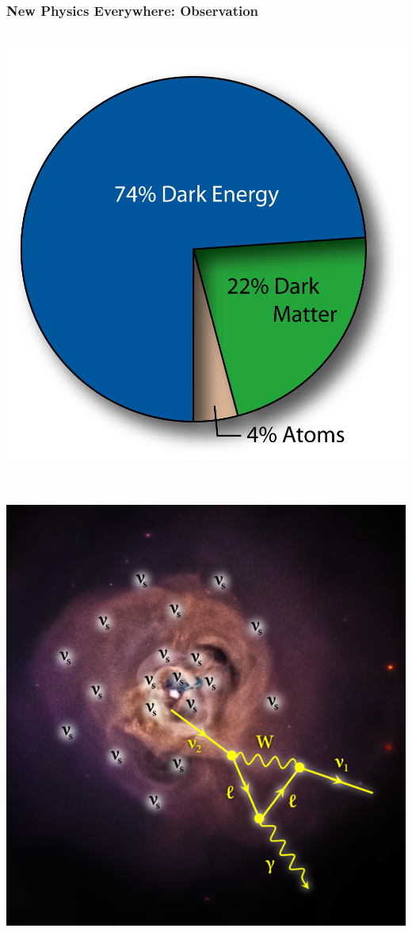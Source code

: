 \documentclass{beamer}
\begin{document}
\begin{frame}
\frametitle{New Physics Everywhere: Observation}
\begin{minipage}[b]{0.80\paperwidth}
 \begin{tcolorbox}[colback=UNL@Cream!5,colframe=UNL@Cream!60,title=\textcolor{UMN@Maroon}{\textbf{Universe Matter Budget.}}]
\mbox{
\includegraphics[height=0.35\linewidth,width=0.50\linewidth]{THESISPLOTS/New-Physics-PLOTS/UniversePie30.jpg} }
   
 \end{tcolorbox}
 
\end{minipage}

\begin{minipage}[b]{0.80\paperwidth}
 \begin{tcolorbox}[colback=UNL@Cream!5,colframe=UNL@Cream!60,title=\textcolor{UMN@Maroon}{\textbf{Dark Matter in our Galaxy?.}}]
 \mbox{
    \includegraphics[height=0.30\linewidth,width=0.50\linewidth]{THESISPLOTS/New-Physics-PLOTS/X-ray-Signature-DM-2014.png}
      }
 \end{tcolorbox}
 
 \end{minipage}
\end{frame}
\end{document}
